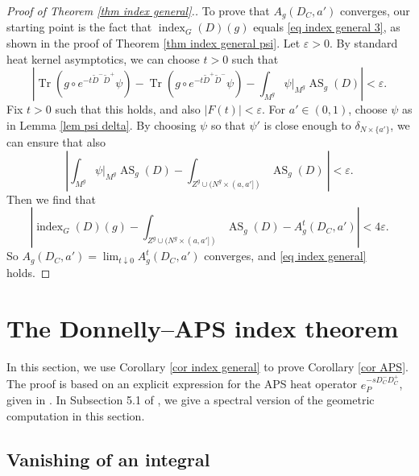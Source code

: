 \documentclass[11pt]{article}
\theoremstyle{plain}
\theoremstyle{definition}
\theoremstyle{remark}
\numberwithin{equation}{section}
\DeclareMathOperator{\Tr}{Tr}
\DeclareMathOperator{\AS}{AS}
\DeclareMathOperator{\ind}{index}
\begin{document}
\begin{proof}[Proof of Theorem \ref{thm index general}.]
To prove that  $A_{g}(D_C, a')$ converges, our starting point is the fact that $\ind_G(D)(g)$ equals \eqref{eq index general 3}, as shown in the proof of Theorem \ref{thm index general psi}.
Let $\varepsilon > 0$. By standard heat kernel asymptotics, we can choose $t>0$ such that
\[
\left|  \Tr(g\circ e^{-t\tilde D^- \tilde D^+}\psi) -  \Tr(g\circ e^{-t\tilde D^+ \tilde D^-}\psi) - \int_{M^g} \psi|_{M^g} \AS_g(D)\right| < \varepsilon.
\]
Fix $t>0$ such that this holds, and also $|F(t)|< \varepsilon$.
For
 $a' \in(0,1)$,
choose $\psi$ as in Lemma \ref{lem psi delta}. By choosing $\psi$ so that $\psi'$ is close enough to $\delta_{N \times \{a'\}}$, we can ensure that also
\[
\left| \int_{M^g} \psi|_{M^g} \AS_g(D) - \int_{Z^g \cup (N^g \times (a,a'])}  \AS_g(D) \ \right|< \varepsilon.
\]
Then we find that
\[
\left| \ind_G(D)(g) -  \int_{Z^g \cup (N^g \times (a,a'])}  \AS_g(D) - A_g^t(D_C,  a') \right|< 4\varepsilon.
\]
So $A_g(D_C, a')  = \lim_{t \downarrow 0}A_g^t(D_C, a') $ converges, and \eqref{eq index general} holds.
\end{proof}

\section{The Donnelly--APS index theorem} \label{sec APS}

In this section, we use Corollary \ref{cor index general} to prove Corollary \ref{cor APS}.
 The proof is based on an explicit expression for the APS heat operator $e_P^{-sD_C^- D_C^+}$, given in \cite{APS1}. In Subsection 5.1 of \cite{HW21b}, we give a spectral version of the geometric computation in this section.

\subsection{Vanishing of an integral}
\end{document}
